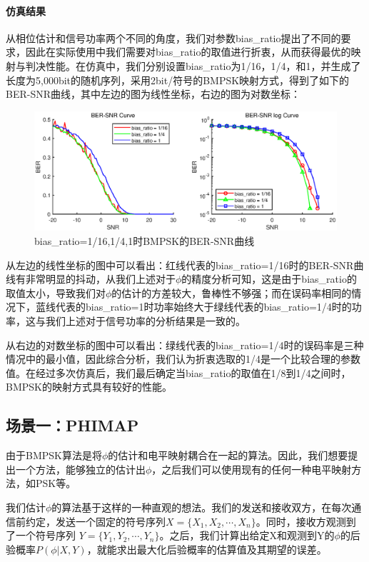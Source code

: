 \paragraph{仿真结果}
\indent

从相位估计和信号功率两个不同的角度，我们对参数bias\_ratio提出了不同的要求，因此在实际使用中我们需要对bias\_ratio的取值进行折衷，从而获得最优的映射与判决性能。在仿真中，我们分别设置bias\_ratio为1/16，1/4，和1，并生成了长度为5,000bit的随机序列，采用2bit/符号的BMPSK映射方式，得到了如下的BER-SNR曲线，其中左边的图为线性坐标，右边的图为对数坐标：

\begin{figure}[h]
    \centering
    \includegraphics[width=\textwidth]{pic/1-1-8.eps}
    \caption{bias\_ratio=1/16,1/4,1时BMPSK的BER-SNR曲线}
\end{figure}

从左边的线性坐标的图中可以看出：红线代表的bias\_ratio=1/16时的BER-SNR曲线有非常明显的抖动，从我们上述对于$\phi$的精度分析可知，这是由于bias\_ratio的取值太小，导致我们对$\phi$的估计的方差较大，鲁棒性不够强；而在误码率相同的情况下，蓝线代表的bias\_ratio=1时功率始终大于绿线代表的bias\_ratio=1/4时的功率，这与我们上述对于信号功率的分析结果是一致的。

从右边的对数坐标的图中可以看出：绿线代表的bias\_ratio=1/4时的误码率是三种情况中的最小值，因此综合分析，我们认为折衷选取的1/4是一个比较合理的参数值。在经过多次仿真后，我们最后确定当bias\_ratio的取值在1/8到1/4之间时，BMPSK的映射方式具有较好的性能。

\subsection{场景一：PHIMAP}

由于BMPSK算法是将$\phi$的估计和电平映射耦合在一起的算法。因此，我们想要提出一个方法，能够独立的估计出$\phi$，之后我们可以使用现有的任何一种电平映射方法，如PSK等。

我们估计$\phi$的算法基于这样的一种直观的想法。我们的发送和接收双方，在每次通信前约定，发送一个固定的符号序列$X=\{X_1,X_2,\cdots,X_n\}$。同时，接收方观测到了一个符号序列 $Y=\{Y_1,Y_2,\cdots,Y_n\}$。之后，我们计算出给定X和观测到Y的$\phi$的后验概率$P(\phi|X,Y)$，就能求出最大化后验概率的估算值及其期望的误差。

